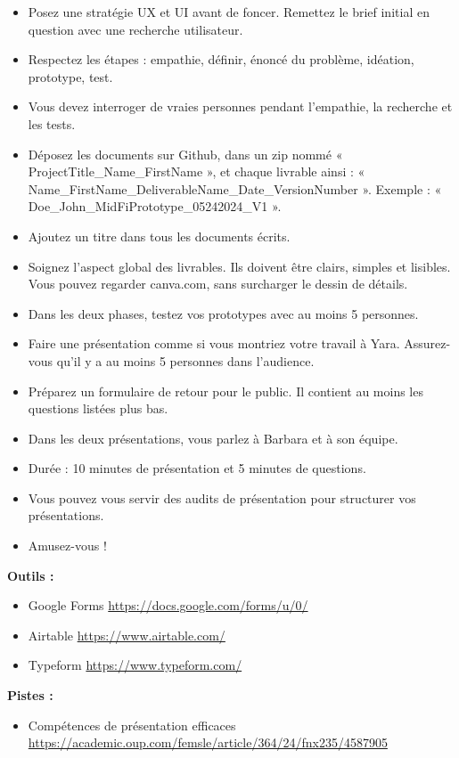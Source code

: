 \begin{itemize}
\item Posez une stratégie UX et UI avant de foncer. Remettez le brief initial en question avec une recherche utilisateur.
\item Respectez les étapes : empathie, définir, énoncé du problème, idéation, prototype, test.
\item Vous devez interroger de vraies personnes pendant l'empathie, la recherche et les tests.
\item Déposez les documents sur Github, dans un zip nommé « ProjectTitle\_Name\_FirstName », et chaque livrable ainsi : « Name\_FirstName\_DeliverableName\_Date\_VersionNumber ». Exemple : « Doe\_John\_MidFiPrototype\_05242024\_V1 ».
\item Ajoutez un titre dans tous les documents écrits.
\item Soignez l'aspect global des livrables. Ils doivent être clairs, simples et lisibles. Vous pouvez regarder canva.com, sans surcharger le dessin de détails.
\item Dans les deux phases, testez vos prototypes avec au moins 5 personnes.
\item Faire une présentation comme si vous montriez votre travail à Yara. Assurez-vous qu'il y a au moins 5 personnes dans l'audience.
\item Préparez un formulaire de retour pour le public. Il contient au moins les questions listées plus bas.
\item Dans les deux présentations, vous parlez à Barbara et à son équipe.
\item Durée : 10 minutes de présentation et 5 minutes de questions.
\item Vous pouvez vous servir des audits de présentation pour structurer vos présentations.
\item Amusez-vous !
\end{itemize}

\textbf{Outils :}

\begin{itemize}
\item Google Forms \url{https://docs.google.com/forms/u/0/}
\item Airtable \url{https://www.airtable.com/}
\item Typeform \url{https://www.typeform.com/}
\end{itemize}

\textbf{Pistes :}

\begin{itemize}
\item Compétences de présentation efficaces \url{https://academic.oup.com/femsle/article/364/24/fnx235/4587905}
\end{itemize}

